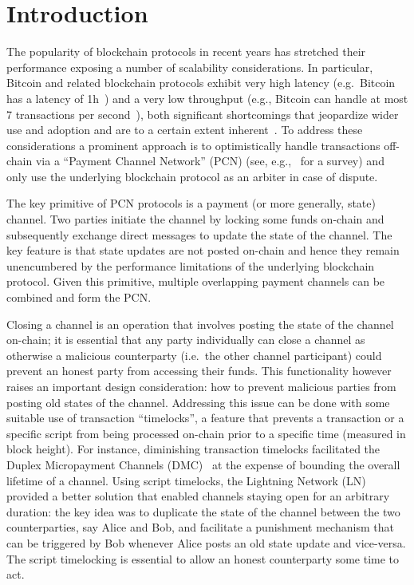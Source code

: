 \section{Introduction}
  The popularity of blockchain protocols 
  in recent years has stretched their
  performance  exposing a number of scalability considerations. 
In particular, 
Bitcoin and related blockchain protocols exhibit very high
  latency (e.g.\ Bitcoin has a latency of 1h~\cite{bitcoin})
  and a very low throughput (e.g., Bitcoin can handle at most 7
  transactions per second~\cite{scaling}), 
both significant shortcomings that jeopardize wider 
use and adoption and are to a certain extent inherent~\cite{scaling}.
To address these considerations
a prominent approach is to optimistically handle
  transactions off-chain via a ``Payment Channel Network'' 
  (PCN) (see, e.g.,~\cite{DBLP:conf/fc/GudgeonMRMG20} for a survey)
  and only use the underlying blockchain protocol as an
  arbiter in case of dispute.

The key primitive of PCN protocols is a 
payment (or more generally, state) channel. 
Two parties initiate the channel by locking
some funds on-chain and subsequently
exchange direct messages to update the state of the channel.
The key feature is that state updates are not posted on-chain
and hence they remain unencumbered by the performance limitations
of the underlying blockchain protocol. 
Given this primitive, multiple overlapping payment
channels can be combined and form the PCN. 

Closing a channel is an operation that involves posting the 
state of the channel on-chain; it is essential that any party
individually can close a channel as otherwise a malicious counterparty (i.e.\ the
other channel participant)
could prevent an honest party  from
accessing their funds. This functionality
however raises an important design consideration: how to prevent malicious parties from posting old states of the channel.
%
Addressing this issue can be done with some suitable use
of  transaction ``timelocks'', a feature that prevents a transaction
or a specific script from being processed on-chain
prior to a specific time (measured in block height). 
%
For instance, diminishing transaction timelocks
facilitated the Duplex Micropayment Channels (DMC)~\cite{decker}
at the expense of bounding the overall lifetime of a channel. 
Using script timelocks, the Lightning Network (LN)~\cite{lightning}
provided a better solution that enabled channels staying open
for an arbitrary duration: the key idea was to duplicate the
state of the channel between the two counterparties, say Alice and Bob, and facilitate a punishment mechanism that can be triggered by Bob whenever Alice posts an old state update and vice-versa. The script timelocking is essential to allow an honest counterparty some time to act.


